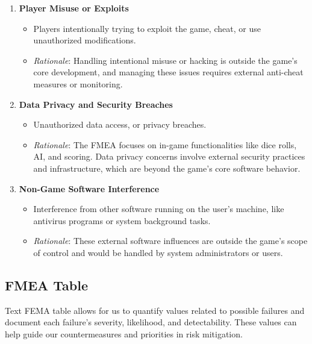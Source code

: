 \documentclass{article}
\begin{document}
\begin{enumerate}
    \item \textbf{Player Misuse or Exploits}
        \begin{itemize}
            \item Players intentionally trying to exploit the game, cheat, or use unauthorized modifications.
            \item \textit{Rationale}: Handling intentional misuse or hacking is outside the game's core development, and managing these issues requires external anti-cheat measures or monitoring.
        \end{itemize}

    \item \textbf{Data Privacy and Security Breaches}
        \begin{itemize}
            \item Unauthorized data access, or privacy breaches.
            \item \textit{Rationale}: The FMEA focuses on in-game functionalities like dice rolls, AI, and scoring. Data privacy concerns involve external security practices and infrastructure, which are beyond the game's core software behavior.
        \end{itemize}

    \item \textbf{Non-Game Software Interference}
        \begin{itemize}
            \item Interference from other software running on the user's machine, like antivirus programs or system background tasks.
            \item \textit{Rationale}: These external software influences are outside the game's scope of control and would be handled by system administrators or users.
        \end{itemize}

\end{enumerate}

\subsection{FMEA Table}

Text FEMA table allows for us to quantify values related to possible failures and document each failure's severity, likelihood, and detectability. These values can help guide our countermeasures and priorities in risk mitigation.
\end{document}
